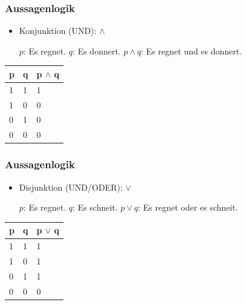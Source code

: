 
\begin{frame}
\frametitle{Aussagenlogik}

\begin{itemize}
	\item Konjunktion (UND): $\land$
	
	\eal
		\ex $p$: Es regnet.
		\ex $q$: Es donnert.
		\ex $p \land q$: Es regnet und es donnert.
	\zl

\end{itemize}
	

\begin{table}
\centering

\begin{tabular}{p{2cm}|p{2cm}|p{2cm}}
\textbf{p} & \textbf{q} & \textbf{p} $\land$ \textbf{q}\\
\hline
1 & 1 & 1\\
\hline
1 & 0 & 0\\
\hline
0 & 1 & 0\\
\hline 
0 & 0 & 0\\
\end{tabular}

\end{table}	

\end{frame}



\begin{frame}
\frametitle{Aussagenlogik}

\begin{itemize}
	\item Disjunktion (UND/ODER): $\lor$

	\eal
		\ex $p$: Es regnet.
		\ex $q$: Es schneit.
		\ex $p \lor q$: Es regnet oder es schneit.
	\zl

\end{itemize}


\begin{table}
\centering

\begin{tabular}{p{2cm}|p{2cm}|p{2cm}}
\textbf{p} & \textbf{q} & \textbf{p} $\lor$ \textbf{q}\\
\hline
1 & 1 & 1\\
\hline
1 & 0 & 1\\
\hline
0 & 1 & 1\\
\hline 
0 & 0 & 0\\
\end{tabular}

\end{table}		

\end{frame}


